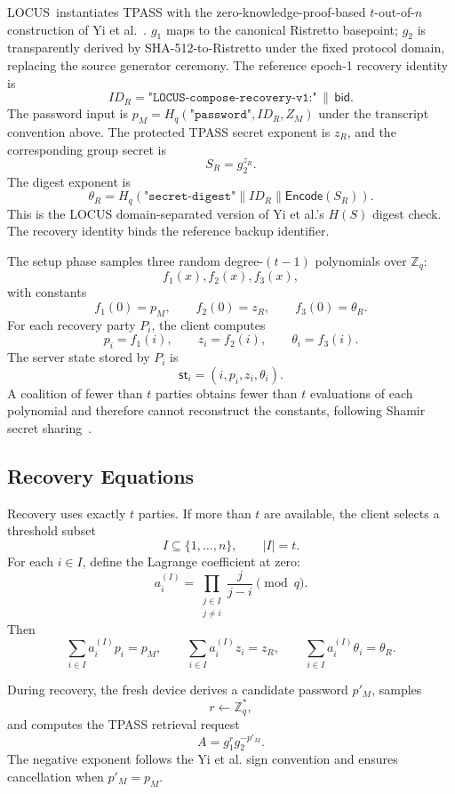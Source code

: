 \documentclass[sigconf,anonymous]{acmart}
\newcounter{protocol}
\newcommand{\LOCUS}{\textsf{LOCUS}}
\newcommand{\Encode}{\mathsf{Encode}}
\begin{document}
\LOCUS\ instantiates TPASS with the zero-knowledge-proof-based \(t\)-out-of-\(n\) construction of Yi et al.~\cite{Yi2015TPASS,Yi2019TPASS}. \(g_1\) maps to the canonical Ristretto basepoint; \(g_2\) is transparently derived by SHA-512-to-Ristretto under the fixed protocol domain, replacing the source generator ceremony. The reference epoch-1 recovery identity is
\[
ID_R=\texttt{"LOCUS-compose-recovery-v1:"}\,\|\,\mathsf{bid}.
\]
The password input is \(p_M=H_q(\texttt{"password"},ID_R,Z_M)\) under the transcript convention above. The protected TPASS secret exponent is \(z_R\), and the corresponding group secret is
\[
S_R=g_2^{z_R}.
\]
The digest exponent is
\[
\theta_R =
H_q(
\texttt{"secret-digest"}
\|ID_R
\|\Encode(S_R)
).
\]
This is the LOCUS domain-separated version of Yi et al.'s \(H(S)\) digest check. The recovery identity binds the reference backup identifier.

The setup phase samples three random degree-\((t-1)\) polynomials over \(\mathbb{Z}_q\):
\[
f_1(x), f_2(x), f_3(x),
\]
with constants
\[
f_1(0)=p_M,\qquad
f_2(0)=z_R,\qquad
f_3(0)=\theta_R.
\]
For each recovery party \(P_i\), the client computes
\[
p_i=f_1(i),\qquad
z_i=f_2(i),\qquad
\theta_i=f_3(i).
\]
The server state stored by \(P_i\) is
\[
\mathsf{st}_i=(i,p_i,z_i,\theta_i).
\]
A coalition of fewer than \(t\) parties obtains fewer than \(t\) evaluations of each polynomial and therefore cannot reconstruct the constants, following Shamir secret sharing~\cite{Shamir1979}.

\subsection{Recovery Equations}

Recovery uses exactly \(t\) parties. If more than \(t\) are available, the client selects a threshold subset
\[
I\subseteq\{1,\ldots,n\},\qquad |I|=t.
\]
For each \(i\in I\), define the Lagrange coefficient at zero:
\begin{equation}
a_i^{(I)}
=
\prod_{\substack{j\in I\\ j\neq i}}
\frac{j}{j-i}
\pmod q.
\label{eq:app-lagrange}
\end{equation}
Then
\[
\sum_{i\in I}a_i^{(I)}p_i=p_M,
\qquad
\sum_{i\in I}a_i^{(I)}z_i=z_R,
\qquad
\sum_{i\in I}a_i^{(I)}\theta_i=\theta_R.
\]

During recovery, the fresh device derives a candidate password \(p'_M\), samples
\[
r\leftarrow\mathbb{Z}_q^\ast,
\]
and computes the TPASS retrieval request
\begin{equation}
A=g_1^r g_2^{-p'_M}.
\label{eq:app-client-request}
\end{equation}
The negative exponent follows the Yi et al. sign convention and ensures cancellation when \(p'_M=p_M\).
\end{document}
